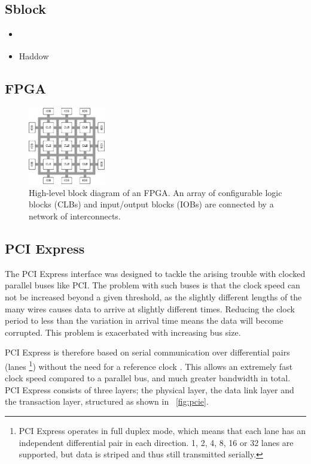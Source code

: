 \subsection{Sblock}

\begin{itemize}
    \item \cite{haddow2000sblock}
    \item Haddow
\end{itemize}

\subsection{FPGA}

\begin{figure}[!ht]
    \centering
    \includegraphics[width=0.30\textwidth]{figures/fpga}
    \caption{High-level block diagram of an FPGA. An array of configurable logic blocks (CLBs) and input/output blocks (IOBs) are connected by a network of interconnects.}
    \label{fig:fpga}
\end{figure}

\TODO

\subsection{PCI Express}

The PCI Express interface was designed to tackle the arising trouble with clocked parallel buses like PCI.
The problem with such buses is that the clock speed can not be increased beyond a given threshold, as the slightly different lengths of the many wires causes data to arrive at slightly different times.
Reducing the clock period to less than the variation in arrival time means the data will become corrupted.
This problem is exacerbated with increasing bus size.

PCI Express is therefore based on serial communication over differential pairs (lanes \footnote{
        PCI Express operates in full duplex mode, which means that each lane has an independent differential pair in each direction.
        1, 2, 4, 8, 16 or 32 lanes are supported, but data is striped and thus still transmitted serially.
    }) without the need for a reference clock \cite{pcie}.
This allows an extremely fast clock speed compared to a parallel bus, and much greater bandwidth in total.
PCI Express consists of three layers; the physical layer, the data link layer and the transaction layer, structured as shown in \figurename~\ref{fig:pcie}.

